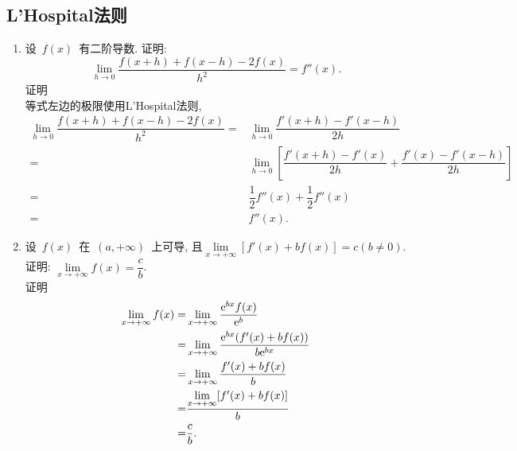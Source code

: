 \documentclass[UTF8,a4paper,20pt]{article}
\begin{document}
\subsection{L'Hospital法则}
\begin{enumerate}
\item 设~$f(x)$~有二阶导数. 证明: 
\[\lim\limits_{h\to 0}\dfrac{f(x+h)+f(x-h)-2f(x)}{h^2}=f''(x).\]
{\heiti 证明}\\
等式左边的极限使用L'Hospital法则,
\begin{equation*}
	\begin{split}
	\lim\limits_{h\to 0}\dfrac{f(x+h)+f(x-h)-2f(x)}{h^2}=&\lim\limits_{h\to 0}\dfrac{f'(x+h)-f'(x-h)}{2h}\\
	=&\lim\limits_{h\to0}\left[\dfrac{f'(x+h)-f'(x)}{2h}+\dfrac{f'(x)-f'(x-h)}{2h}\right]\\
	=&\dfrac{1}{2}f''(x)+\dfrac{1}{2}f''(x)\\
	=&f''(x).
	\end{split}
\end{equation*}

\item 设~$f(x)$~在~$(a,+\infty)$~上可导, 且$\lim\limits_{x\to+\infty}[f'(x)+bf(x)]=c(b\neq0)$. 证明: $\lim\limits_{x\to+\infty}f(x)=\dfrac{c}{b}$.\\
{\heiti 证明}\\
\begin{equation*}
	\begin{split}
	\lim\limits_{x\to+\infty}f(x)=&\lim\limits_{x\to+\infty}\dfrac{\mathrm{e}^{bx}f(x)}{\mathrm{e}^{b}}\\
	=&\lim\limits_{x\to+\infty}\dfrac{\mathrm{e}^{bx}(f'(x)+bf(x))}{b\mathrm{e}^{bx}}\\
	=&\lim\limits_{x\to+\infty}\dfrac{f'(x)+bf(x)}{b}\\
	=&\dfrac{\lim\limits_{x\to+\infty}[f'(x)+bf(x)]}{b}\\
	=&\dfrac{c}{b}.
	\end{split}
\end{equation*}


\end{enumerate}
\end{document}
